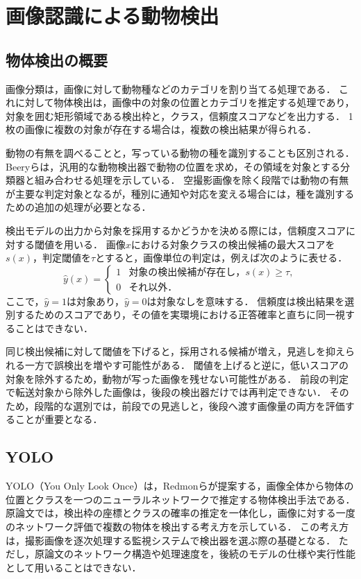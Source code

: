 \section{画像認識による動物検出}
\label{sec:background-detection}
\subsection{物体検出の概要}
画像分類は，画像に対して動物種などのカテゴリを割り当てる処理である．
これに対して物体検出は，画像中の対象の位置とカテゴリを推定する処理であり，対象を囲む矩形領域である検出枠と，クラス，信頼度スコアなどを出力する．
1枚の画像に複数の対象が存在する場合は，複数の検出結果が得られる．

動物の有無を調べることと，写っている動物の種を識別することも区別される．
Beeryらは，汎用的な動物検出器で動物の位置を求め，その領域を対象とする分類器と組み合わせる処理を示している\cite{Beery2019}．
空撮影画像を除く段階では動物の有無が主要な判定対象となるが，種別に通知や対応を変える場合には，種を識別するための追加の処理が必要となる．

検出モデルの出力から対象を採用するかどうかを決める際には，信頼度スコアに対する閾値を用いる．
画像$x$における対象クラスの検出候補の最大スコアを$s(x)$，判定閾値を$\tau$とすると，画像単位の判定は，例えば次のように表せる．
\begin{equation}
  \hat{y}(x)=
  \begin{cases}
    1 & \text{対象の検出候補が存在し，}s(x)\geq\tau,\\
    0 & \text{それ以外．}
  \end{cases}
  \label{eq:background-threshold}
\end{equation}
ここで，$\hat{y}=1$は対象あり，$\hat{y}=0$は対象なしを意味する．
信頼度は検出結果を選別するためのスコアであり，その値を実環境における正答確率と直ちに同一視することはできない．

同じ検出候補に対して閾値を下げると，採用される候補が増え，見逃しを抑えられる一方で誤検出を増やす可能性がある．
閾値を上げると逆に，低いスコアの対象を除外するため，動物が写った画像を残せない可能性がある．
前段の判定で転送対象から除外した画像は，後段の検出器だけでは再判定できない．
そのため，段階的な選別では，前段での見逃しと，後段へ渡す画像量の両方を評価することが重要となる．

\subsection{YOLO}
YOLO（You Only Look Once）は，Redmonら\cite{Redmon2016}が提案する，画像全体から物体の位置とクラスを一つのニューラルネットワークで推定する物体検出手法である．
原論文では，検出枠の座標とクラスの確率の推定を一体化し，画像に対する一度のネットワーク評価で複数の物体を検出する考え方を示している．
この考え方は，撮影画像を逐次処理する監視システムで検出器を選ぶ際の基礎となる．
ただし，原論文のネットワーク構造や処理速度を，後続のモデルの仕様や実行性能として用いることはできない．


